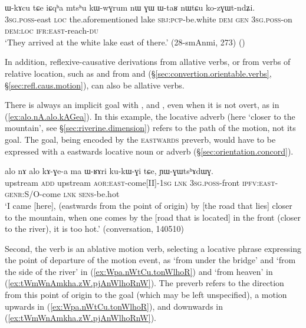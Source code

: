 \begin{exe}
	\ex \label{ex:WkAcu.kozGWtndZi}
	\gll ɯ-kɤcu tɕe iɕqʰa mtsʰu kɯ-wɣrum nɯ ɣɯ ɯ-taʁ nɯtɕu ko-zɣɯt-ndʑi. \\ 
	\textsc{3sg}.\textsc{poss}-east \textsc{loc} the.aforementioned lake \textsc{sbj}:\textsc{pcp}-be.white \textsc{dem} \textsc{gen} \textsc{3sg}.\textsc{poss}-on \textsc{dem}:\textsc{loc} \textsc{ifr}:\textsc{east}-reach-\textsc{du} \\
	\glt `They arrived at the white lake east of there.' (28-smAnmi, 273)
()
\end{exe}


In addition, reflexive-causative derivations from allative verbs, or from verbs of relative location, such as  and  from  and  (§\ref{sec:convertion.orientable.verbs}, §\ref{sec:refl.caus.motion}), can also be allative verbs.

There is always an implicit goal with ,  and , even when it is not overt, as in (\ref{ex:alo.nA.alo.kAGea}). In this example, the locative adverb  (here `closer to the mountain', see §\ref{sec:riverine.dimension}) refers to the path of the motion, not its goal. The goal, being encoded by the \textsc{eastwards} preverb, would have to be expressed with a eastwards locative noun or adverb (§\ref{sec:orientation.concord}).

\begin{exe}
\ex \label{ex:alo.nA.alo.kAGea}
\gll alo nɤ alo kɤ-ɣe-a ma ɯ-ʁɤri ku-kɯ-ɣi tɕe, ɲɯ-ɣɯtsʰɤdɯɣ. \\
upstream \textsc{add} upstream \textsc{aor}:\textsc{east}-come[II]-\textsc{1sg} \textsc{lnk} \textsc{3sg}.\textsc{poss}-front \textsc{ipfv}:\textsc{east}-\textsc{genr}:S/O-come \textsc{lnk} \textsc{sens}-be.hot \\
\glt `I came [here], (eastwards from the point of origin) by [the road that lies] closer to the mountain, when one comes by the [road that is located] in the front (closer to the river), it is too hot.' (conversation, 140510)
\end{exe}

Second, the verb  is an ablative motion verb, selecting a locative phrase expressing the point of departure of the motion event, as  `from under the bridge' and  `from the side of the river' in (\ref{ex:Wpa.nWtCu.tonWlhoR}) and  `from heaven' in (\ref{ex:tWmWnAmkha.zW.pjAnWlhoRnW}). The preverb refers to the direction from this point of origin to the goal (which may be left unspecified), a motion upwards in (\ref{ex:Wpa.nWtCu.tonWlhoR}), and downwards in (\ref{ex:tWmWnAmkha.zW.pjAnWlhoRnW}).

